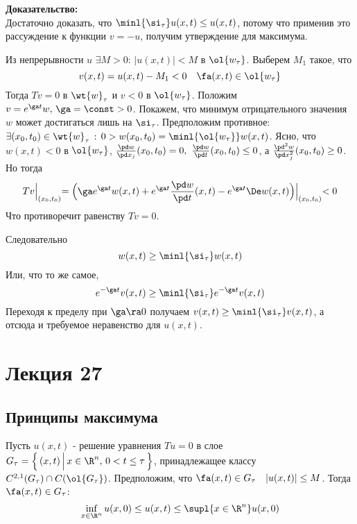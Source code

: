 \documentclass[a4paper,draft]{article}
\begin{document}
\noindent\textbf{Доказательство:}\\
Достаточно доказать, что $\minl{\si_\tau} u(x,t)\le u(x,t)$,
потому что применив это рассуждение к функции $v=-u$, получим
утверждение для максимума.

Из непрерывности $u$ $\exists M>0:\, |u(x,t)|<M$ в $\ol{
w_\tau}$. Выберем $M_1$ такое, что
$$
v(x,t)=u(x,t)-M_1<0 \quad \fa (x,t)\in \ol{ w_\tau}
$$
Тогда $Tv=0$ в $\wt{w}_\tau$ и $v<0$ в $\ol{ w_\tau}$.
 Положим $v=e^{\ga t}w,\,\ga=\const>0$. Покажем, что минимум отрицательного значения $w$ может достигаться
лишь на $\si_\tau$. Предположим противное: $\exists
(x_0,t_0)\in \wt{w}_\tau \,: \, 0>w(x_0,t_0)=\minl{\ol{w_\tau}} w(x,t)$. Ясно, что $w(x,t)<0$ в $\ol{ w_\tau}$,
$\frac{\pd w}{\pd x_j}(x_0,t_0)=0,\ \frac{\pd
w}{\pd t}(x_0,t_0)\le 0$, а $\frac{\pd^2 w}{\pd
x_j^2}(x_0,t_0)\ge 0$. Но тогда
$$
Tv\Bigl|_{(x_0,t_0)}=\Bigl(\ga e^{\ga t}w(x,t)+e^{\ga
t}\frac{\pd w}{\pd t}(x,t)-e^{\ga t}\De
w(x,t)\Bigr)\Bigl|_{(x_0,t_0)}<0
$$
Что противоречит равенству $Tv=0$.

Следовательно
$$
w(x,t)\ge \minl{\si_\tau} w(x,t)
$$
Или, что то же самое,
$$
e^{-\ga t} v(x,t)\ge \minl{\si_\tau} e^{-\ga t} v(x,t)
$$
Переходя к пределу при $\ga\ra 0$  получаем $v(x,t)\ge
\minl{\si_\tau} v(x,t)$, а отсюда и требуемое неравенство для
$u(x,t)$.




\section{Лекция 27}
\subsection{Принципы максимума}


\begin{theorem}
Пусть $u(x,t)$ - решение уравнения $Tu=0$ в слое
$G_\tau=\left\{\,(x,t)\,\Bigl|\,x\in \R^n,\,0<t\le \tau\,
\right\}$, принадлежащее классу $C^{2,1}(G_\tau)\cap C(\ol{
G_\tau})$. Предположим, что $\fa (x,t)\in G_\tau\quad
|u(x,t)|\le M$. Тогда $\fa (x,t)\in G_\tau$:
$$
\inf_{x \in \R^n} u(x,0)\le u(x,t)\le \supl{x \in \R^n} u(x,0)
$$
\end{theorem}
\end{document}
